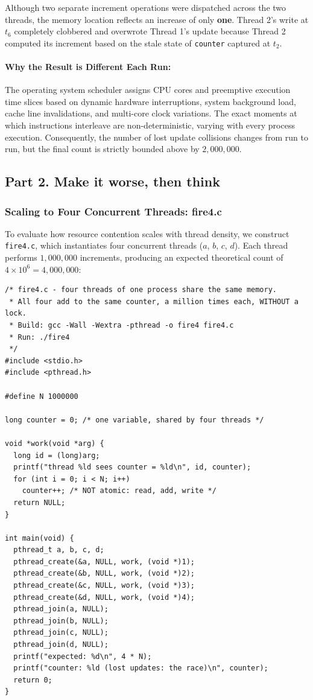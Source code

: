 \documentclass{labreport}
\begin{document}
Although two separate increment operations were dispatched across the two threads, the memory location reflects an increase of only \textbf{one}. Thread 2's write at $t_6$ completely clobbered and overwrote Thread 1's update because Thread 2 computed its increment based on the stale state of \texttt{counter} captured at $t_2$.

\paragraph{Why the Result is Different Each Run:}
The operating system scheduler assigns CPU cores and preemptive execution time slices based on dynamic hardware interruptions, system background load, cache line invalidations, and multi-core clock variations. The exact moments at which instructions interleave are non-deterministic, varying with every process execution. Consequently, the number of lost update collisions changes from run to run, but the final count is strictly bounded above by $2{,}000{,}000$.

\subsection{Part 2. Make it worse, then think}

\subsubsection{Scaling to Four Concurrent Threads: fire4.c}
To evaluate how resource contention scales with thread density, we construct \texttt{fire4.c}, which instantiates four concurrent threads ($a$, $b$, $c$, $d$). Each thread performs $1{,}000{,}000$ increments, producing an expected theoretical count of $4 \times 10^6 = 4{,}000{,}000$:

\begin{lstlisting}[style=c]
/* fire4.c - four threads of one process share the same memory.
 * All four add to the same counter, a million times each, WITHOUT a lock.
 * Build: gcc -Wall -Wextra -pthread -o fire4 fire4.c
 * Run: ./fire4
 */
#include <stdio.h>
#include <pthread.h>

#define N 1000000

long counter = 0; /* one variable, shared by four threads */

void *work(void *arg) {
  long id = (long)arg;
  printf("thread %ld sees counter = %ld\n", id, counter);
  for (int i = 0; i < N; i++)
    counter++; /* NOT atomic: read, add, write */
  return NULL;
}

int main(void) {
  pthread_t a, b, c, d;
  pthread_create(&a, NULL, work, (void *)1);
  pthread_create(&b, NULL, work, (void *)2);
  pthread_create(&c, NULL, work, (void *)3);
  pthread_create(&d, NULL, work, (void *)4);
  pthread_join(a, NULL);
  pthread_join(b, NULL);
  pthread_join(c, NULL);
  pthread_join(d, NULL);
  printf("expected: %d\n", 4 * N);
  printf("counter: %ld (lost updates: the race)\n", counter);
  return 0;
}
\end{lstlisting}
\end{document}
